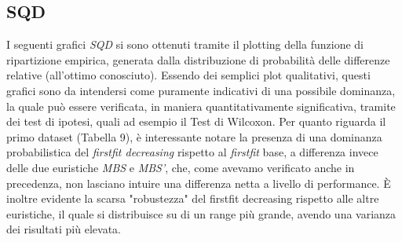 \documentclass{article}
\begin{document}
\subsection{SQD}
I seguenti grafici \textit{SQD} si sono ottenuti tramite il plotting della funzione di ripartizione empirica, generata dalla distribuzione di probabilità delle differenze relative (all'ottimo conosciuto). 
\newline
\newline
Essendo dei semplici plot qualitativi, questi grafici sono da intendersi come puramente indicativi di una possibile dominanza, la quale può essere verificata, in maniera quantitativamente significativa, tramite dei test di ipotesi, quali ad esempio il  Test di Wilcoxon.
\newline
\newline
Per quanto riguarda il primo dataset (Tabella 9), è interessante notare la presenza di una dominanza probabilistica del \textit{firstfit decreasing} rispetto al \textit{firstfit} base, a differenza invece delle due euristiche \textit{MBS} e \textit{MBS'}, che, come avevamo verificato anche in precedenza, non lasciano intuire una differenza netta a livello di performance. È inoltre evidente la scarsa "robustezza" del firstfit decreasing rispetto alle altre euristiche, il quale si distribuisce su di un range più grande, avendo una varianza dei risultati più elevata.
\end{document}
